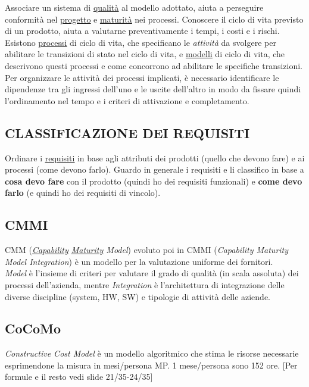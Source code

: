 		Associare un sistema di \underline{\hyperref[qualita]{qualità}} al modello adottato, aiuta a perseguire conformità nel \underline{\hyperref[progetto]{progetto}} e \underline{\hyperref[maturita]{maturità}} nei processi.	Conoscere il ciclo di vita previsto di un prodotto, aiuta a valutarne preventivamente i tempi, i costi e i rischi. Esistono \underline{\hyperref[processo]{processi}} di ciclo di vita, che specificano le \textit{attività} da svolgere per abilitare le transizioni di stato nel ciclo di vita, e \underline{\hyperref[modelli]{modelli}} di ciclo di vita, che descrivono questi processi e come concorrono ad abilitare le specifiche transizioni. Per organizzare le attività dei processi implicati, è necessario identificare le dipendenze tra gli ingressi dell'uno e le uscite dell'altro in modo da fissare quindi l'ordinamento nel tempo e i criteri di attivazione e completamento.
	
		\subsection{CLASSIFICAZIONE DEI REQUISITI}  \label{classificazione}
		Ordinare i \underline{\hyperref[requirements]{requisiti}} in base agli attributi dei prodotti (quello che devono fare) e ai processi (come devono farlo). Guardo in generale i requisiti e li classifico in base a \textbf{cosa devo fare} con il prodotto (quindi ho dei requisiti funzionali) e \textbf{come devo farlo} (e quindi ho dei requisiti di vincolo).
		
		\subsection{CMMI}	 \label{cmmi} %
		CMM (\textit{\underline{\hyperref[capability]{Capability}} \underline{\hyperref[maturity]{Maturity}} Model}) evoluto poi in CMMI (\textit{Capability Maturity Model Integration}) è un modello per la valutazione uniforme dei fornitori. \\
		\textit{Model} è l'insieme di criteri per valutare il grado di qualità (in scala assoluta) dei processi dell’azienda, mentre \textit{Integration} è l'architettura di integrazione delle diverse discipline (system, HW, SW) e tipologie di attività delle aziende.
		
		\subsection{CoCoMo}	 \label{cocomo}
		\textit{Constructive Cost Model} è un modello algoritmico che stima le risorse necessarie esprimendone la misura in mesi/persona MP. 1 mese/persona sono 152 ore. [Per formule e il resto vedi slide 21/35-24/35]  
		
